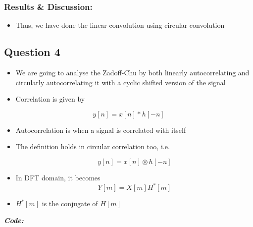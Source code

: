 \documentclass[11pt, a4paper]{article}
\begin{document}
\subsubsection{Results \& Discussion:}\label{results-discussion}
\begin{itemize}
  \item Thus, we have done the linear convolution using circular convolution
\end{itemize}
\newpage

\subsection{Question 4}
\begin{itemize}
  \item We are going to analyse the Zadoff-Chu by both linearly autocorrelating and circularly autocorrelating it with a cyclic shifted version of the signal
  \item Correlation is given by 
\end{itemize}
  \begin{equation}
   y[n] = x[n]*h[-n]
  \end{equation}
  \begin{itemize}
  \item Autocorrelation is when a signal is correlated with itself
  \item The definition holds in circular correlation too, i.e.
  
  \begin{equation}
    y[n] = x[n]\circledast h[-n]
   \end{equation}
   \item In DFT domain, it becomes
   \begin{equation}
    Y[m] = X[m]H^{*}[m]
   \end{equation}
   \item $H^{*}[m]$ is the conjugate of $H[m]$
\end{itemize}
\textit{\textbf{Code:}}
\end{document}
